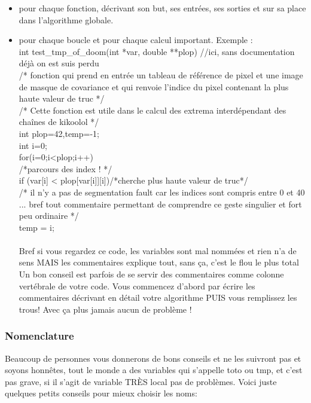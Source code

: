 \begin{itemize}
 \item pour chaque fonction,
d\'ecrivant  son but, ses entrées, ses sorties et sur sa place dans l'algorithme globale.

 \item pour chaque boucle et pour chaque calcul important. Exemple :\\

int test\_tmp\_of\_doom(int *var, double **plop) //ici, sans documentation déjà on est suis perdu \\ 
/* fonction qui prend en entrée un tableau de référence de pixel et une image de masque de covariance
 et qui renvoie l'indice du pixel contenant la plus haute valeur de truc */\\
/* Cette fonction est utile dans le calcul des extrema interdépendant des chaînes de kikoolol */\\

int plop=42,temp=-1;\\
int i=0;\\

for(i=0;i<plop;i++){\\ 
/*parcours des index ! */\\
if (var[i] < plop[var[i]][i])/*cherche plus haute valeur de truc*/\\
/* il n'y a pas de segmentation fault car les indices sont compris entre 0 et 40 ... bref tout
 commentaire permettant de comprendre ce geste singulier et fort peu ordinaire */\\
temp = i;\\
}\\

Bref si vous regardez ce code, les variables sont mal nommées et rien n'a de sens MAIS les
 commentaires explique tout, sans ça, c'est le flou le plus total\\
Un bon conseil est parfois de se servir des commentaires comme colonne vertébrale de votre 
code. Vous commencez d'abord par écrire les commentaires décrivant en détail votre algorithme 
PUIS vous remplissez les trous! Avec ça plus jamais aucun de problème ! \\
\end{itemize}

\subsubsection*{Nomenclature}

Beaucoup de personnes vous donnerons de bons conseils et ne les suivront pas et soyons honnêtes, 
tout le monde a des variables qui s'appelle toto ou tmp, et c'est pas grave, si il s'agit de 
variable TRÈS local pas de problèmes. 
Voici juste quelques petits conseils pour mieux choisir 
les noms:\\

